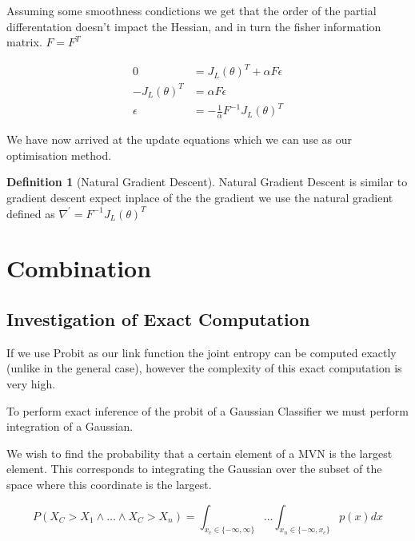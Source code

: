 \documentclass[12pt, a4paper]{report}
\theoremstyle{definition}
\newtheorem{definition}{Definition}[section]
\begin{document}
Assuming some smoothness condictions we get that the order of the partial differentation doesn't impact the Hessian, and in turn the fisher information matrix. $F = F^T$

\begin{align}
   0 &=  J_L \left( \theta\right)^T + \alpha F \epsilon\\
   - J_L \left( \theta\right)^T &=  \alpha F \epsilon\\
  \epsilon &=  - \frac{1}{\alpha} F^{-1} J_L \left( \theta\right) ^T
\end{align} 

We have now arrived at the update equations which we can use as our optimisation method.


\begin{definition}[Natural Gradient Descent]
    Natural Gradient Descent is similar to gradient descent expect inplace of the the gradient we use the natural gradient defined as $\nabla^{\prime} =  F^{-1} J_L \left( \theta \right)^T$
\end{definition}









\chapter{Combination}
\label{Chap5}

\section{Investigation of Exact Computation}

\label{sec:Integration}

If we use Probit as our link function the joint entropy can be computed exactly (unlike in the general case), however the complexity of this exact computation is very high.

To perform exact inference of the probit of a Gaussian Classifier we must perform integration of a Gaussian.

We wish to find the probability that a certain element of a MVN is the largest element. This corresponds to integrating the Gaussian over the subset of the space where this coordinate is the largest.

$$P(X_C > X_1 \land \ldots \land X_C > X_n) = \int_{x_c \in \{ -\infty, \infty \} } \ldots \int_{x_n \in \{ -\infty , x_c \}} p(x) dx$$
\end{document}
